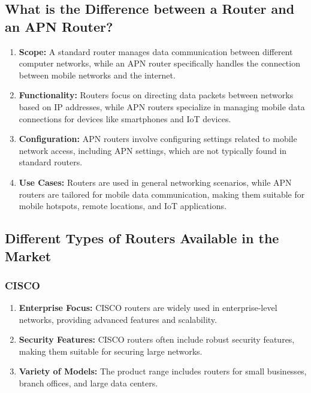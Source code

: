 \documentclass[11pt]{article}
\begin{document}
\subsection{What is the Difference between a Router and an APN Router?}
\begin{enumerate}
  \item \textbf{Scope:} A standard router manages data communication between different computer networks, while an APN router specifically handles the connection between mobile networks and the internet.

  \item \textbf{Functionality:} Routers focus on directing data packets between networks based on IP addresses, while APN routers specialize in managing mobile data connections for devices like smartphones and IoT devices.

  \item \textbf{Configuration:} APN routers involve configuring settings related to mobile network access, including APN settings, which are not typically found in standard routers.

  \item \textbf{Use Cases:} Routers are used in general networking scenarios, while APN routers are tailored for mobile data communication, making them suitable for mobile hotspots, remote locations, and IoT applications.
\end{enumerate}

\subsection{Different Types of Routers Available in the Market}
\subsubsection{CISCO}
\begin{enumerate}
  \item \textbf{Enterprise Focus:} CISCO routers are widely used in enterprise-level networks, providing advanced features and scalability.

  \item \textbf{Security Features:} CISCO routers often include robust security features, making them suitable for securing large networks.

  \item \textbf{Variety of Models:} The product range includes routers for small businesses, branch offices, and large data centers.
\end{enumerate}
\end{document}
